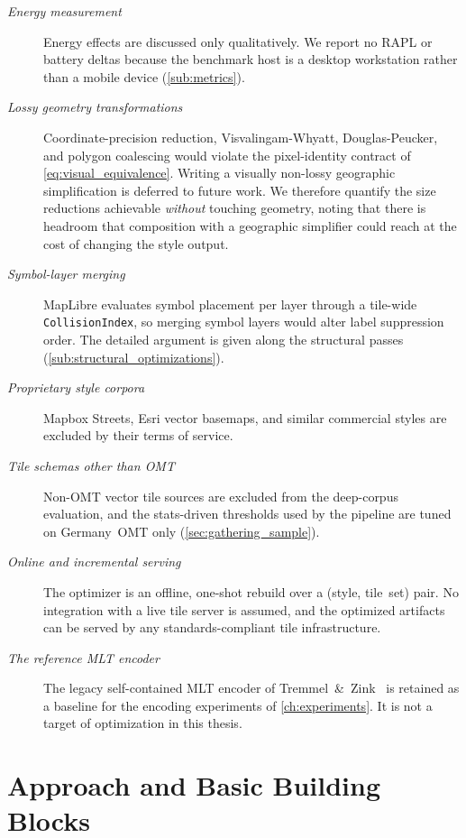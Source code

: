 \begin{description}
    \item[\emph{Energy measurement}] Energy effects are discussed only qualitatively.
We report no \ac{RAPL} or battery deltas because the benchmark host is a desktop workstation rather than a mobile device (\cref{sub:metrics}).
    \item[\emph{Lossy geometry transformations}] Coordinate-precision reduction, Visvalingam-Whyatt, Douglas-Peucker, and polygon coalescing would violate the pixel-identity contract of \cref{eq:visual_equivalence}.
    Writing a visually non-lossy geographic simplification is deferred to future work.
    We therefore quantify the size reductions achievable \emph{without} touching geometry, noting that there is headroom that composition with a geographic simplifier could reach at the cost of changing the style output.
    \item[\emph{Symbol-layer merging}] MapLibre evaluates symbol placement per layer through a tile-wide\newline
    \noindent\texttt{CollisionIndex}, so merging symbol layers would alter label suppression order.
The detailed argument is given along the structural passes (\cref{sub:structural_optimizations}).
    \item[\emph{Proprietary style corpora}] Mapbox Streets, Esri vector basemaps, and similar commercial styles are excluded by their terms of service.
    \item[\emph{Tile schemas other than \ac{OMT}}] Non-\ac{OMT} vector tile sources are excluded from the deep-corpus evaluation, and the stats-driven thresholds used by the pipeline are tuned on Germany~\ac{OMT} only (\cref{sec:gathering_sample}).
    \item[\emph{Online and incremental serving}] The optimizer is an offline, one-shot rebuild over a (style, tile~set) pair.
No integration with a live tile server is assumed, and the optimized artifacts can be served by any standards-compliant tile infrastructure.
    \item[\emph{The reference \ac{MLT} encoder}] The legacy self-contained \ac{MLT} encoder of Tremmel~\&~Zink~\cite{tremmelMapLibreTileNext2025b} is retained as a baseline for the encoding experiments of \cref{ch:experiments}.
It is not a target of optimization in this thesis.
\end{description}

\section{Approach and Basic Building Blocks}\label{sec:approach}

